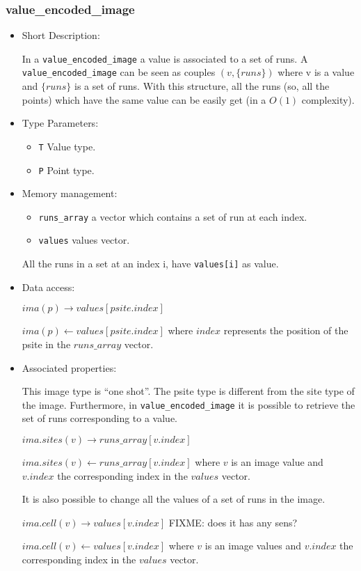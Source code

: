 \subsubsection{value\_encoded\_image}
\begin{itemize}
\item{Short Description:}


In a \verb+value_encoded_image+ a value is associated to a set of runs.
A \verb+value_encoded_image+ can be seen as couples $(v,  \{runs\})$ where
v is a value and $\{runs\}$ is a set of runs.
With this structure, all the runs (so, all the points) which have the same
value can be easily get (in a $O(1)$ complexity).


\item{Type Parameters:}

\begin{itemize}
\item \verb+T+ Value type.
\item \verb+P+ Point type.
\end{itemize}

\item{Memory management:}

\begin{itemize}
\item \verb+runs_array+ a vector which contains a set of run at each index.
\item \verb+values+ values vector.
\end{itemize}

All the runs in a  set at an index i, have \verb+values[i]+ as value.

\item{Data access:}

$ima(p) \rightarrow values[psite.index]$

$ima(p) \leftarrow  values[psite.index]$ where $index$ represents the position
of the psite in the $runs\_array$ vector.


\item{Associated properties:}

This image type is ``one shot''.
The psite type is different from the site type of the image.
Furthermore, in \verb+value_encoded_image+ it is possible to retrieve
the set of runs corresponding to a value.

$ima.sites(v) \rightarrow runs\_array[v.index]$

$ima.sites(v) \leftarrow  runs\_array[v.index]$ where $v$ is an image value
and $v.index$ the corresponding index in the  $values$ vector.

It is also possible to change all the values of a set of runs in the image.

$ima.cell(v) \rightarrow values[v.index]$ FIXME: does it has any sens?

$ima.cell(v) \leftarrow  values[v.index]$ where $v$ is an image values
and $v.index$ the corresponding index in the  $values$ vector.



\end{itemize}




